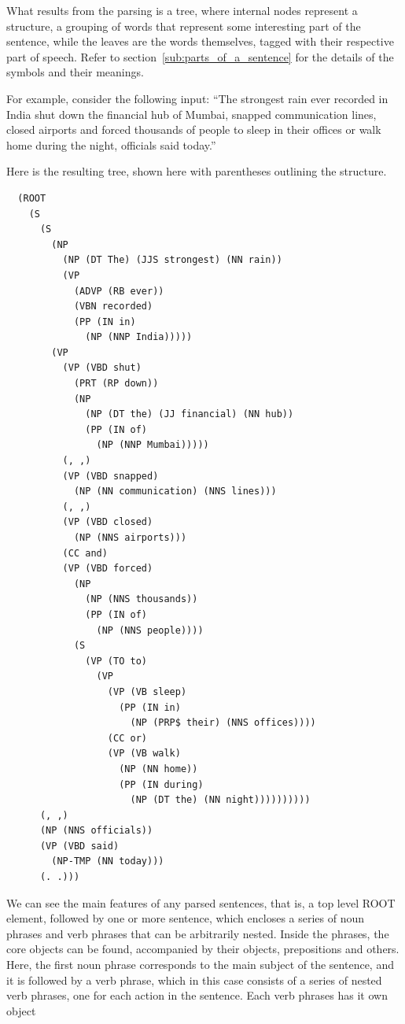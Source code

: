What results from the parsing is a tree, where internal nodes represent a structure, a grouping of words that represent some interesting part of the sentence, while the leaves are the words themselves, tagged with their respective part of speech. Refer to section~\ref{sub:parts_of_a_sentence} for the details of the symbols and their meanings.

For example, consider the following input: ``The strongest rain ever recorded in India shut down the financial hub of Mumbai, snapped communication lines, closed airports and forced thousands of people to sleep in their offices or walk home during the night, officials said today.''

Here is the resulting tree, shown here with parentheses outlining the structure.
\begin{verbatim}
  (ROOT
    (S
      (S
        (NP
          (NP (DT The) (JJS strongest) (NN rain))
          (VP
            (ADVP (RB ever))
            (VBN recorded)
            (PP (IN in)
              (NP (NNP India)))))
        (VP
          (VP (VBD shut)
            (PRT (RP down))
            (NP
              (NP (DT the) (JJ financial) (NN hub))
              (PP (IN of)
                (NP (NNP Mumbai)))))
          (, ,)
          (VP (VBD snapped)
            (NP (NN communication) (NNS lines)))
          (, ,)
          (VP (VBD closed)
            (NP (NNS airports)))
          (CC and)
          (VP (VBD forced)
            (NP
              (NP (NNS thousands))
              (PP (IN of)
                (NP (NNS people))))
            (S
              (VP (TO to)
                (VP
                  (VP (VB sleep)
                    (PP (IN in)
                      (NP (PRP$ their) (NNS offices))))
                  (CC or)
                  (VP (VB walk)
                    (NP (NN home))
                    (PP (IN during)
                      (NP (DT the) (NN night))))))))))
      (, ,)
      (NP (NNS officials))
      (VP (VBD said)
        (NP-TMP (NN today)))
      (. .)))
\end{verbatim}

We can see the main features of any parsed sentences, that is, a top level ROOT element, followed by one or more sentence, which encloses a series of noun phrases and verb phrases that can be arbitrarily nested. Inside the phrases, the core objects can be found, accompanied by their objects, prepositions and others. Here, the first noun phrase corresponds to the main subject of the sentence, and it is followed by a verb phrase, which in this case consists of a series of nested verb phrases, one for each action in the sentence. Each verb phrases has it own object




